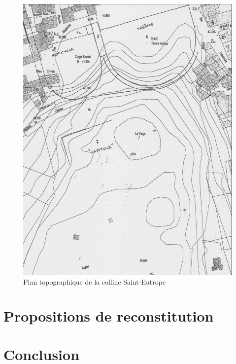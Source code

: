 \begin{figure}[!h]
	\includegraphics[width=\linewidth]{images/colline}
	\caption[Plan topographique de la colline Saint-Eutrope]{Plan topographique de la colline Saint-Eutrope \cite[p.11]{orangeTxt}}
	\label{colline} 
\end{figure} 


		
	\chapter{Propositions de reconstitution}
		\minitoc
		\newpage
		
	\chapter*{Conclusion}
		\newpage
			
 
 



